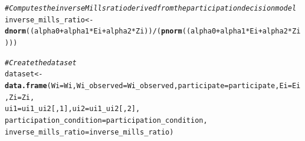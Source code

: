 \documentclass{article}\usepackage[]{graphicx}\usepackage[]{xcolor}
\makeatletter
\newcommand{\hlnum}[1]{\textcolor[rgb]{0.686,0.059,0.569}{#1}}%
\newcommand{\hlcom}[1]{\textcolor[rgb]{0.678,0.584,0.686}{\textit{#1}}}%
\newcommand{\hlopt}[1]{\textcolor[rgb]{0,0,0}{#1}}%
\newcommand{\hldef}[1]{\textcolor[rgb]{0.345,0.345,0.345}{#1}}%
\newcommand{\hlkwb}[1]{\textcolor[rgb]{0.69,0.353,0.396}{#1}}%
\newcommand{\hlkwc}[1]{\textcolor[rgb]{0.333,0.667,0.333}{#1}}%
\newcommand{\hlkwd}[1]{\textcolor[rgb]{0.737,0.353,0.396}{\textbf{#1}}}%
\newenvironment{kframe}{%
 \def\at@end@of@kframe{}%
 \ifinner\ifhmode%
  \def\at@end@of@kframe{\end{minipage}}%
  \begin{minipage}{\columnwidth}%
 \fi\fi%
 \def\FrameCommand##1{\hskip\@totalleftmargin \hskip-\fboxsep
 \colorbox{shadecolor}{##1}\hskip-\fboxsep
     \hskip-\linewidth \hskip-\@totalleftmargin \hskip\columnwidth}%
 \MakeFramed {\advance\hsize-\width
   \@totalleftmargin\z@ \linewidth\hsize
   \@setminipage}}%
 {\par\unskip\endMakeFramed%
 \at@end@of@kframe}
\newenvironment{knitrout}{}{} %
\makeatother
\begin{document}
\begin{knitrout}
\begin{kframe}
\begin{alltt}
\hlcom{# Computes the inverse Mills ratio derived from the participation decision model}
\hldef{inverse_mills_ratio} \hlkwb{<-} \hlkwd{dnorm}\hldef{((alpha0}\hlopt{+}\hldef{alpha1}\hlopt{*}\hldef{Ei}\hlopt{+}\hldef{alpha2}\hlopt{*}\hldef{Zi))}\hlopt{/}\hldef{(}\hlkwd{pnorm}\hldef{((alpha0}\hlopt{+}\hldef{alpha1}\hlopt{*}\hldef{Ei}\hlopt{+}\hldef{alpha2}\hlopt{*}\hldef{Zi)))}

\hlcom{# Create the dataset}
\hldef{dataset} \hlkwb{<-} \hlkwd{data.frame}\hldef{(}\hlkwc{Wi}\hldef{=Wi,}\hlkwc{Wi_observed}\hldef{=Wi_observed,}\hlkwc{participate}\hldef{=participate,}\hlkwc{Ei}\hldef{=Ei,}\hlkwc{Zi}\hldef{=Zi,}
                      \hlkwc{ui1}\hldef{=ui1_ui2[,}\hlnum{1}\hldef{],}\hlkwc{ui2}\hldef{=ui1_ui2[,}\hlnum{2}\hldef{],}
                      \hlkwc{participation_condition}\hldef{=participation_condition,}
                      \hlkwc{inverse_mills_ratio}\hldef{=inverse_mills_ratio)}


\end{alltt}
\end{kframe}
\end{knitrout}
\end{document}
